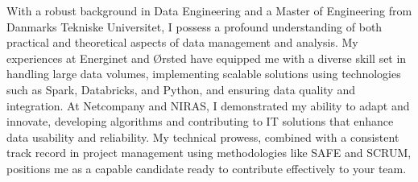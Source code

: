 
With a robust background in Data Engineering and a Master of Engineering from Danmarks Tekniske Universitet, I possess a profound understanding of both practical and theoretical aspects of data management and analysis.
 My experiences at Energinet and Ørsted have equipped me with a diverse skill set in handling large data volumes, implementing scalable solutions using technologies such as Spark, Databricks, and Python, and ensuring data quality and integration.
 At Netcompany and NIRAS, I demonstrated my ability to adapt and innovate, developing algorithms and contributing to IT solutions that enhance data usability and reliability.
 My technical prowess, combined with a consistent track record in project management using methodologies like SAFE and SCRUM, positions me as a capable candidate ready to contribute effectively to your team.

